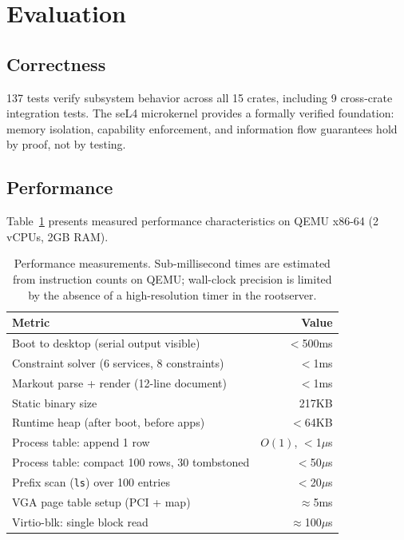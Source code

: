 \documentclass[11pt,a4paper]{article}
\begin{document}
\section{Evaluation}
\label{sec:eval}

\subsection{Correctness}

137 tests verify subsystem behavior across all 15 crates, including 9 cross-crate integration tests. The seL4 microkernel provides a formally verified foundation: memory isolation, capability enforcement, and information flow guarantees hold by proof, not by testing.

\subsection{Performance}
\label{sec:perf}

Table~\ref{tab:perf} presents measured performance characteristics on QEMU x86-64 (2 vCPUs, 2GB RAM).

\begin{table}[h]
\centering
\begin{tabular}{lr}
\toprule
\textbf{Metric} & \textbf{Value} \\
\midrule
Boot to desktop (serial output visible)   & $<$500ms \\
Constraint solver (6 services, 8 constraints) & $<$1ms \\
Markout parse + render (12-line document)   & $<$1ms \\
Static binary size                          & 217KB \\
Runtime heap (after boot, before apps)      & $<$64KB \\
Process table: append 1 row                 & $O(1)$, $<$1$\mu$s \\
Process table: compact 100 rows, 30 tombstoned & $<$50$\mu$s \\
Prefix scan (\texttt{ls}) over 100 entries  & $<$20$\mu$s \\
VGA page table setup (PCI + map)            & $\approx$5ms \\
Virtio-blk: single block read              & $\approx$100$\mu$s \\
\bottomrule
\end{tabular}
\caption{Performance measurements. Sub-millisecond times are estimated from instruction counts on QEMU; wall-clock precision is limited by the absence of a high-resolution timer in the rootserver.}
\label{tab:perf}
\end{table}
\end{document}
